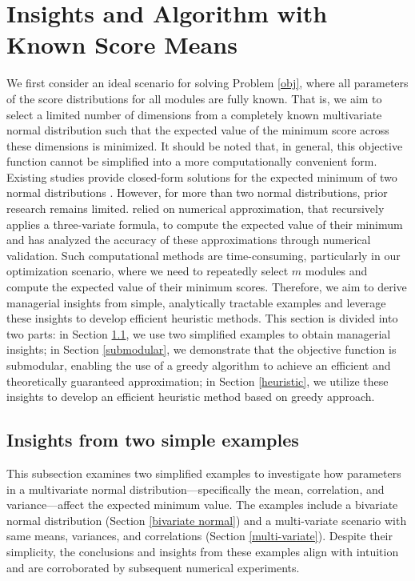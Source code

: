 \documentclass[opre,sglanonrev]{informs4}
\begin{document}
\section{Insights and Algorithm with Known Score Means}
\label{know means}
We first consider an ideal scenario for solving Problem \eqref{obj}, where all parameters of the score distributions for all modules are fully known. That is, we aim to select a limited number of dimensions from a completely known multivariate normal distribution such that the expected value of the minimum score across these dimensions is minimized. It should be noted that, in general, this objective function cannot be simplified into a more computationally convenient form. Existing studies provide closed-form solutions for the expected minimum of two normal distributions \citep{nadarajah2008exact}. However, for more than two normal distributions, prior research remains limited. \cite{clark1961greatest} relied on numerical approximation, that recursively applies a three-variate formula, to compute the expected value of their minimum and has analyzed the accuracy of these approximations through numerical validation. Such computational methods are time-consuming, particularly in our optimization scenario, where we need to repeatedly select $m$ modules and compute the expected value of their minimum scores. Therefore, we aim to derive managerial insights from simple, analytically tractable examples and leverage these insights to develop efficient heuristic methods. This section is divided into two parts: in Section \ref{insights}, we use two simplified examples to obtain managerial insights; in Section \ref{submodular}, we demonstrate that the objective function is submodular, enabling the use of a greedy algorithm to achieve an efficient and theoretically guaranteed approximation; in Section \ref{heuristic}, we utilize these insights to develop an efficient heuristic method based on greedy approach.

\subsection{Insights from two simple examples}
\label{insights}
This subsection examines two simplified examples to investigate how parameters in a multivariate normal distribution—specifically the mean, correlation, and variance—affect the expected minimum value. The examples include a bivariate normal distribution (Section \ref{bivariate normal}) and a multi-variate scenario with same means, variances, and correlations (Section \ref{multi-variate}). Despite their simplicity, the conclusions and insights from these examples align with intuition and are corroborated by subsequent numerical experiments.
\end{document}
